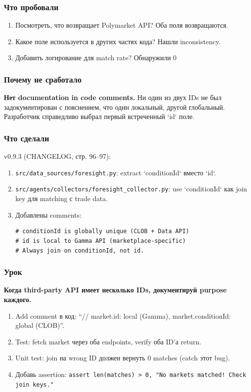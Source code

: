 \subsubsection*{Что пробовали}
\begin{enumerate}
\item Посмотреть, что возвращает Polymarket API? Оба поля возвращаются.
\item Какое поле используется в других частях кода? Нашли inconsistency.
\item Добавить логирование для match rate? Обнаружили 0%
\end{enumerate}

\subsubsection*{Почему не сработало}
\textbf{Нет documentation in code comments.} Ни один из двух IDs не был задокументирован с пояснением, что один локальный, другой глобальный. Разработчик справедливо выбрал первый встреченный `id` поле.

\subsubsection*{Что сделали}
v0.9.3 (CHANGELOG, стр. 96--97):

\begin{enumerate}
\item \texttt{src/data\_sources/foresight.py}: extract `conditionId` вместо `id`.
\item \texttt{src/agents/collectors/foresight\_collector.py}: use `conditionId` как join key для matching с trade data.
\item Добавлены comments:
\begin{verbatim}
# conditionId is globally unique (CLOB + Data API)
# id is local to Gamma API (marketplace-specific)
# Always join on conditionId, not id.
\end{verbatim}
\end{enumerate}

\subsubsection*{Урок}
\textbf{Когда third-party API имеет несколько IDs, документируй purpose каждого.}

\begin{enumerate}
\item Add comment в код: ``// market.id: local (Gamma), market.conditionId: global (CLOB)''.
\item Test: fetch market через оба endpoints, verify оба ID'а return.
\item Unit test: join на wrong ID должен вернуть 0 matches (catch этот bug).
\item Добавь assertion: \texttt{assert len(matches) > 0, "No markets matched! Check join keys."}
\end{enumerate}

